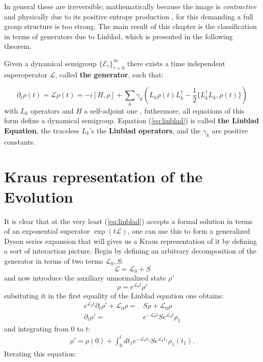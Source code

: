 In general these are irreversible; mathematically because the image is \textit{contractive} and physically due to its
positive entropy production \cite{breuer2002theory}, for this demanding a full group structure is too strong. The main result
of this chapter is the classification in terms of generators due to Linblad, which is presented in the following theorem.

\begin{theorem}
  Given a dynamical semigroup $\{\mathcal{E}_{\tau}\}_{\tau=0}^{\infty}$ there exists a time independent superoperator $\mathcal{L}$, called
  \textbf{the generator}, such that:

  \begin{equation}\label{eq:linblad}
  \partial_{t}\rho(t) = \mathcal{L}\rho(t) = -i[ H,\rho ] + \sum_{k}\gamma_{k}\left(L_{k}\rho(t) L_{k}^{\dagger} - \frac{1}{2}\{L_{k}^{\dagger}L_{k}, \rho(t)\}\right)
  \end{equation}
  with $L_{k}$ operators  and $H$ a self-adjoint one \cite{breuer2002theory, lindblad1976generators, wiseman_quantum_2010,hornberger2009introduction}, futhermore, all equations of this form define a dynamical semigroup.
  Equation (\ref{eq:linblad}) is called \textbf{the Linblad Equation}, the traceless $L_{k}$'s the \textbf{Linblad operators}, and
  the $\gamma_{k}$ are positive constants.
\end{theorem}

\section{Kraus representation of the Evolution}
It is clear that at the very least (\ref{eq:linblad}) accepts a formal solution in terms of an exponential superator $\exp(t\mathcal{L})$, one
can use this to form a generalized Dyson series expansion that will gives us a Kraus representation of it by defining a sort
of interaction picture. Begin by defining an
arbitrary decomposition of the generator in terms of two terms $\mathcal{L}_{0}, S$:
\begin{equation}
  \mathcal{L} = \mathcal{L}_{0} + S
\end{equation}
and now introduce the auxiliary unnormalized state $\rho'$
\begin{equation}
\rho = e^{\mathcal{L}_{0}t}\rho'
\end{equation}
subsituting it in the first equality of the Linblad equation one obtains:
\begin{align}
  e^{\mathcal{L}_{0}t}\partial_{t}\rho' + \mathcal{L}_{0}\rho =& S\rho + \mathcal{L}_{0}\rho \\
\partial_{t}\rho' =& e^{-\mathcal{L}_{0}t}Se^{\mathcal{L}_{0}t}\rho_{1}
\end{align}
and integrating from 0 to $t$:
\begin{align}
\rho' = \rho(0) + \int_{0}^{t}dt_{1} e^{-\mathcal{L}_{0}t_{1}}Se^{\mathcal{L}_{0}t_{1}}\rho_{1}(t_{1}).
\end{align}
Iterating this equation:

